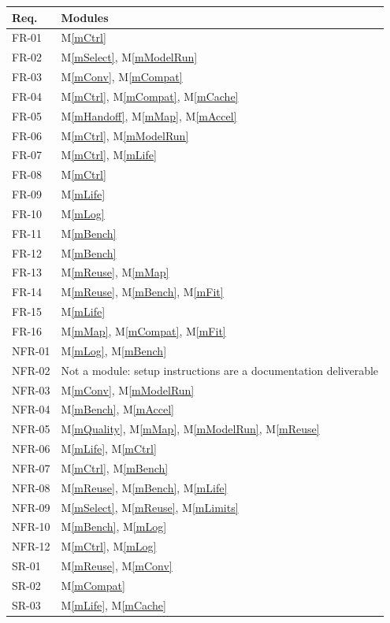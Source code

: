 \documentclass[12pt, titlepage]{article}
\newcommand{\mref}[1]{M\ref{#1}}
\begin{document}
\begin{table}[H]
\centering
\small
\begin{tabular}{p{} p{}}
\toprule
\textbf{Req.} & \textbf{Modules}\\
\midrule
FR-01 & \mref{mCtrl}\\
FR-02 & \mref{mSelect}, \mref{mModelRun}\\
FR-03 & \mref{mConv}, \mref{mCompat}\\
FR-04 & \mref{mCtrl}, \mref{mCompat}, \mref{mCache}\\
FR-05 & \mref{mHandoff}, \mref{mMap}, \mref{mAccel}\\
FR-06 & \mref{mCtrl}, \mref{mModelRun}\\
FR-07 & \mref{mCtrl}, \mref{mLife}\\
FR-08 & \mref{mCtrl}\\
FR-09 & \mref{mLife}\\
FR-10 & \mref{mLog}\\
FR-11 & \mref{mBench}\\
FR-12 & \mref{mBench}\\
FR-13 & \mref{mReuse}, \mref{mMap}\\
FR-14 & \mref{mReuse}, \mref{mBench}, \mref{mFit}\\
FR-15 & \mref{mLife}\\
FR-16 & \mref{mMap}, \mref{mCompat}, \mref{mFit}\\
NFR-01 & \mref{mLog}, \mref{mBench}\\
NFR-02 & Not a module: setup instructions are a documentation deliverable\\
NFR-03 & \mref{mConv}, \mref{mModelRun}\\
NFR-04 & \mref{mBench}, \mref{mAccel}\\
NFR-05 & \mref{mQuality}, \mref{mMap}, \mref{mModelRun}, \mref{mReuse}\\
NFR-06 & \mref{mLife}, \mref{mCtrl}\\
NFR-07 & \mref{mCtrl}, \mref{mBench}\\
NFR-08 & \mref{mReuse}, \mref{mBench}, \mref{mLife}\\
NFR-09 & \mref{mSelect}, \mref{mReuse}, \mref{mLimits}\\
NFR-10 & \mref{mBench}, \mref{mLog}\\
NFR-12 & \mref{mCtrl}, \mref{mLog}\\
SR-01 & \mref{mReuse}, \mref{mConv}\\
SR-02 & \mref{mCompat}\\
SR-03 & \mref{mLife}, \mref{mCache}\\

\end{tabular}
\end{table}
\end{document}
